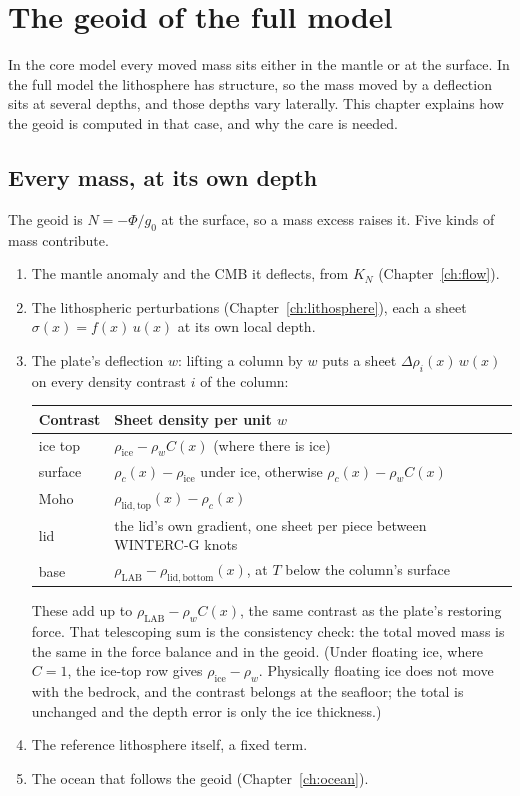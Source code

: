 \chapter{The geoid of the full model}
\label{ch:geoid}

In the core model every moved mass sits either in the mantle or at the surface.
In the full model the lithosphere has structure, so the mass moved by a deflection sits at several depths, and those depths vary laterally.
This chapter explains how the geoid is computed in that case, and why the care is needed.

\section{Every mass, at its own depth}

The geoid is $N = -\Phi/g_0$ at the surface, so a mass excess raises it.
Five kinds of mass contribute.
\begin{enumerate}[nosep]
\item The mantle anomaly and the CMB it deflects, from $K_N$ (Chapter~\ref{ch:flow}).
\item The lithospheric perturbations (Chapter~\ref{ch:lithosphere}), each a sheet $\sigma(x) = f(x)\,u(x)$ at its own local depth.
\item The plate's deflection $w$: lifting a column by $w$ puts a sheet $\Delta\rho_i(x)\,w(x)$ on every density contrast $i$ of the column:
\begin{center}
\begin{tabular}{ll}
\toprule
Contrast & Sheet density per unit $w$ \\
\midrule
ice top & $\rho_{\mathrm{ice}} - \rho_w C(x)$ (where there is ice)\\
surface & $\rho_c(x) - \rho_{\mathrm{ice}}$ under ice, otherwise $\rho_c(x) - \rho_w C(x)$ \\
Moho & $\rho_{\mathrm{lid,top}}(x) - \rho_c(x)$\\
lid & the lid's own gradient, one sheet per piece between WINTERC-G knots\\
base & $\rho_{\mathrm{LAB}} - \rho_{\mathrm{lid,bottom}}(x)$, at $T$ below the column's surface\\
\bottomrule
\end{tabular}
\end{center}
These add up to $\rho_{\mathrm{LAB}}-\rho_w C(x)$, the same contrast as the plate's restoring force.
That telescoping sum is the consistency check: the total moved mass is the same in the force balance and in the geoid.
(Under floating ice, where $C=1$, the ice-top row gives $\rho_{\mathrm{ice}}-\rho_w$. Physically floating ice does not move with the bedrock, and the contrast belongs at the seafloor; the total is unchanged and the depth error is only the ice thickness.)
\item The reference lithosphere itself, a fixed term.
\item The ocean that follows the geoid (Chapter~\ref{ch:ocean}).
\end{enumerate}

